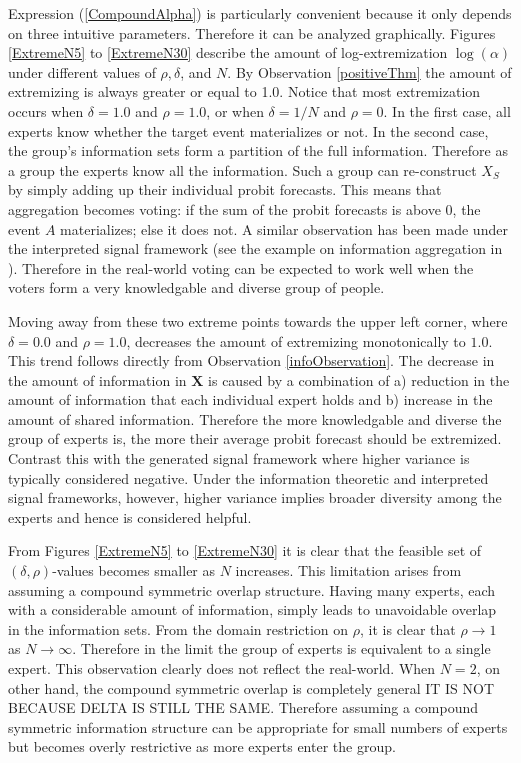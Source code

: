 \documentclass[11pt,twoside]{article}
\begin{document}
Expression (\ref{CompoundAlpha}) is particularly convenient because it only depends on three intuitive parameters. Therefore it can be analyzed graphically. Figures \ref{ExtremeN5} to \ref{ExtremeN30} describe the amount of log-extremization $\log(\alpha)$ under different values of $\rho, \delta$, and $N$. By Observation \ref{positiveThm} the amount of extremizing is always greater or equal to 1.0. Notice that most extremization occurs when $\delta = 1.0$ and $\rho = 1.0$, or when  $\delta = 1/N$ and $\rho = 0$. In the first case, all experts know whether the target event materializes or not. In the second case, the group's information sets form a partition of the full information. Therefore as a group the experts know all the information. Such a group can re-construct $X_S$ by simply adding up their individual probit forecasts. This means that aggregation becomes voting: if the sum of the probit forecasts is above 0, the event $A$ materializes; else it does not. A similar observation has been made under the interpreted signal framework (see the example on information aggregation in \cite{hong2009interpreted}). Therefore in the real-world voting can be expected to work well when the voters form a very knowledgable and diverse group of people. 


Moving away from these two extreme points towards the upper left corner, where $\delta = 0.0$ and $\rho = 1.0$, decreases the amount of extremizing monotonically to $1.0$. This trend follows directly from Observation \ref{infoObservation}. The decrease in the amount of information in $\boldsymbol{X}$  is caused by a combination of a) reduction in the amount of information that each individual expert holds and b) increase in the amount of shared information. Therefore the more knowledgable and diverse the group of experts is, the more their average probit forecast should be extremized. Contrast this with the generated signal framework where higher variance is typically considered negative. Under the information theoretic and interpreted signal frameworks, however, higher variance implies broader diversity among the experts and hence is considered helpful. 

From Figures \ref{ExtremeN5} to \ref{ExtremeN30} it is clear that the feasible set of $(\delta, \rho)$-values becomes smaller as $N$ increases. This limitation arises from assuming a compound symmetric overlap structure. Having many experts, each with a considerable amount of information, simply leads to unavoidable overlap in the information sets. From the domain restriction on $\rho$, it is clear that $\rho \to 1$ as $N \to \infty$. Therefore in the limit the group of experts is equivalent to a single expert. This observation clearly does not reflect the real-world. When $N = 2$, on other hand, the compound symmetric overlap is completely general IT IS NOT BECAUSE DELTA IS STILL THE SAME. Therefore assuming a compound symmetric information structure can be appropriate for small numbers of experts but becomes overly restrictive as more experts enter the group. 
\end{document}
